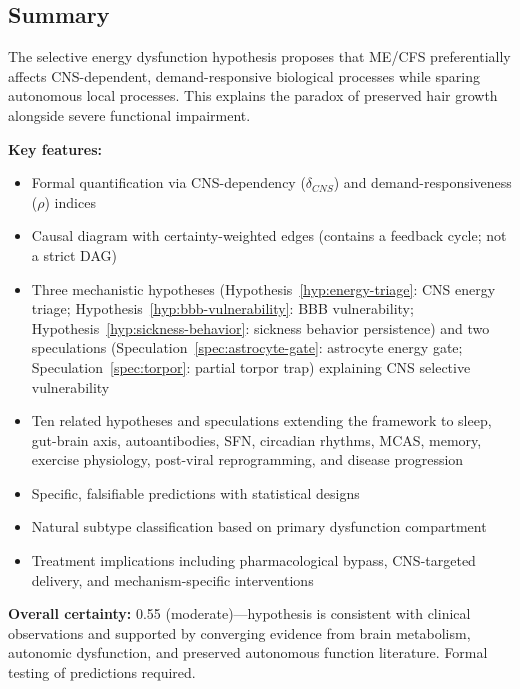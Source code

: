 \subsection{Summary}

\begin{conclusion}
The selective energy dysfunction hypothesis proposes that ME/CFS preferentially affects CNS-dependent, demand-responsive biological processes while sparing autonomous local processes. This explains the paradox of preserved hair growth alongside severe functional impairment.

\textbf{Key features:}
\begin{itemize}
    \item Formal quantification via CNS-dependency ($\delta_{CNS}$) and demand-responsiveness ($\rho$) indices
    \item Causal diagram with certainty-weighted edges (contains a feedback cycle; not a strict DAG)
    \item Three mechanistic hypotheses (Hypothesis~\ref{hyp:energy-triage}: CNS energy triage; Hypothesis~\ref{hyp:bbb-vulnerability}: BBB vulnerability; Hypothesis~\ref{hyp:sickness-behavior}: sickness behavior persistence) and two speculations (Speculation~\ref{spec:astrocyte-gate}: astrocyte energy gate; Speculation~\ref{spec:torpor}: partial torpor trap) explaining CNS selective vulnerability
    \item Ten related hypotheses and speculations extending the framework to sleep, gut-brain axis, autoantibodies, SFN, circadian rhythms, MCAS, memory, exercise physiology, post-viral reprogramming, and disease progression
    \item Specific, falsifiable predictions with statistical designs
    \item Natural subtype classification based on primary dysfunction compartment
    \item Treatment implications including pharmacological bypass, CNS-targeted delivery, and mechanism-specific interventions
\end{itemize}

\textbf{Overall certainty:} 0.55 (moderate)---hypothesis is consistent with clinical observations and supported by converging evidence from brain metabolism, autonomic dysfunction, and preserved autonomous function literature. Formal testing of predictions required.
\end{conclusion}

